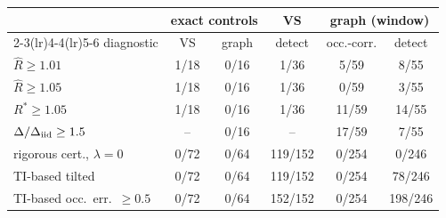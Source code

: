 \begin{tabular}{l@{\hspace{5pt}}ccccc}
\toprule
 & \multicolumn{2}{c}{exact controls} & VS & \multicolumn{2}{c}{graph (window)} \\
\cmidrule(lr){2-3}\cmidrule(lr){4-4}\cmidrule(lr){5-6}
diagnostic & VS & graph & detect & occ.-corr. & detect \\
\midrule
$\widehat R\ge1.01$ & 1/18 & 0/16 & 1/36 & 5/59 & 8/55 \\
$\widehat R\ge1.05$ & 1/18 & 0/16 & 1/36 & 0/59 & 3/55 \\
$R^\ast\ge1.05$ & 1/18 & 0/16 & 1/36 & 11/59 & 14/55 \\
$\Delta/\Delta_{\rm iid}\ge1.5$ & -- & 0/16 & -- & 17/59 & 7/55 \\
\midrule
rigorous cert., $\lambda{=}0$ & 0/72 & 0/64 & 119/152 & 0/254 & 0/246 \\
TI-based tilted & 0/72 & 0/64 & 119/152 & 0/254 & 78/246 \\
TI-based occ.\ err.\ ${}\ge0.5$ & 0/72 & 0/64 & 152/152 & 0/254 & 198/246 \\
\bottomrule
\end{tabular}
